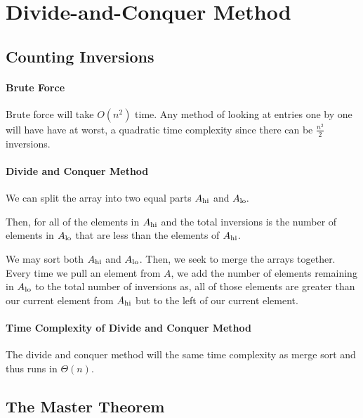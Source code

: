 
\section{Divide-and-Conquer Method}

\subsection{Counting Inversions}

\paragraph{Brute Force}
Brute force will take \(O(n^2)\) time. Any method of looking at entries
one by one will have have at worst, a quadratic time complexity
since there can be \(\frac{n^2}{2}\) inversions.

\paragraph{Divide and Conquer Method}
We can split the array into two equal parts \(A_{\mathrm{hi}}\) and \(A_{\mathrm{lo}}.\)

Then, for all of the elements in \(A_{\mathrm{hi}}\) and the total inversions is
the number of elements in \(A_{\mathrm{lo}}\) that are less than the elements of
\(A_{\mathrm{hi}}\).

We may sort both \(A_{\mathrm{hi}}\) and \(A_{\mathrm{lo}}\).
Then, we seek to merge the arrays together. Every time we pull an element
from \(A\), we add the number of elements remaining in \(A_{\mathrm{lo}}\)
to the total number of inversions as, all of those elements are greater than
our current element from \(A_{\mathrm{hi}}\) but to the left of our current element.

\paragraph{Time Complexity of Divide and Conquer Method}
The divide and conquer method will the same time complexity as
merge sort and thus runs in \(\Theta (n)\).

\subsection{The Master Theorem}


